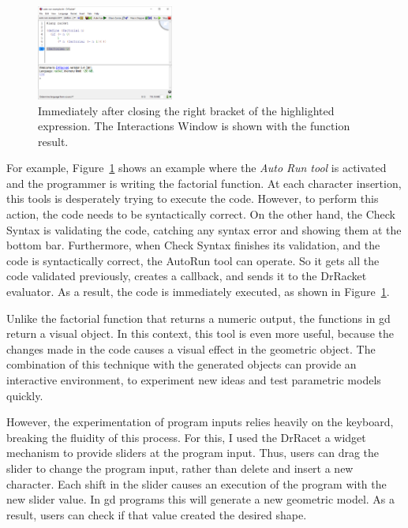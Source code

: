 \begin{figure}[!h]
  \centering
  \includegraphics[width=0.4\textwidth]{images/fact-eval}
  \caption{Immediately after closing the right bracket of the highlighted expression. The Interactions Window is shown with the function result.}
  \label{fig:fact-complete}
\end{figure}

For example, Figure~\ref{fig:fact-complete} shows an example where the \textit{Auto Run tool} is activated and the programmer is writing the factorial function. At each character insertion, this tools is desperately trying to execute the code. However, to perform this action, the code needs to be syntactically correct. On the other hand, the Check Syntax is validating the code, catching any syntax error and showing them at the bottom bar. Furthermore, when Check Syntax finishes its validation, and the code is syntactically correct, the AutoRun tool can operate. So it gets all the code validated previously, creates a callback, and sends it to the DrRacket evaluator. As a result, the code is immediately executed, as shown in Figure~\ref{fig:fact-complete}.

Unlike the factorial function that returns a numeric output, the functions in \gls{gd} return a visual object. In this context, this tool is even more useful, because the changes made in the code causes a visual effect in the geometric object. The combination of this technique with the generated objects can provide an interactive environment, to experiment new ideas and test parametric models quickly.

However, the experimentation of program inputs relies heavily on the keyboard, breaking the fluidity of this process. For this, I used the DrRacet a widget mechanism to provide sliders at the program input. Thus, users can drag the slider to change the program input, rather than delete and insert a new character. Each shift in the slider causes an execution of the program with the new slider value. In \gls{gd} programs this will generate a new geometric model. As a result, users can check if that value created the desired shape. 

